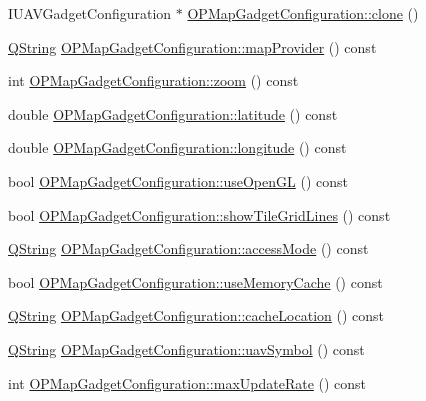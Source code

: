 \begin{DoxyCompactItemize}
\item 
\-I\-U\-A\-V\-Gadget\-Configuration $\ast$ \hyperlink{group___o_p_map_plugin_gad04d5a814a94033d32e4bbb42321c105}{\-O\-P\-Map\-Gadget\-Configuration\-::clone} ()
\item 
\hyperlink{group___u_a_v_objects_plugin_gab9d252f49c333c94a72f97ce3105a32d}{\-Q\-String} \hyperlink{group___o_p_map_plugin_ga377c1d600009ec04bfa92e3a259c7071}{\-O\-P\-Map\-Gadget\-Configuration\-::map\-Provider} () const 
\item 
int \hyperlink{group___o_p_map_plugin_ga0e5e3cbf297d14ff236edcf0ce5f4c8f}{\-O\-P\-Map\-Gadget\-Configuration\-::zoom} () const 
\item 
double \hyperlink{group___o_p_map_plugin_gaa2e49a8d2ff144343b4467f078374b0a}{\-O\-P\-Map\-Gadget\-Configuration\-::latitude} () const 
\item 
double \hyperlink{group___o_p_map_plugin_ga3faeb4ba6e69dd97e9f8451b35e47c7e}{\-O\-P\-Map\-Gadget\-Configuration\-::longitude} () const 
\item 
bool \hyperlink{group___o_p_map_plugin_ga1b6fe88d155611b041e3e1e9213f1ab5}{\-O\-P\-Map\-Gadget\-Configuration\-::use\-Open\-G\-L} () const 
\item 
bool \hyperlink{group___o_p_map_plugin_ga6bea5e6009e16f4a53c4e235dfd1594b}{\-O\-P\-Map\-Gadget\-Configuration\-::show\-Tile\-Grid\-Lines} () const 
\item 
\hyperlink{group___u_a_v_objects_plugin_gab9d252f49c333c94a72f97ce3105a32d}{\-Q\-String} \hyperlink{group___o_p_map_plugin_ga2a0ae25b0c5f6fb24f2b2f791a9fe997}{\-O\-P\-Map\-Gadget\-Configuration\-::access\-Mode} () const 
\item 
bool \hyperlink{group___o_p_map_plugin_gae363a6d1100a72e8a2089d08c192bb87}{\-O\-P\-Map\-Gadget\-Configuration\-::use\-Memory\-Cache} () const 
\item 
\hyperlink{group___u_a_v_objects_plugin_gab9d252f49c333c94a72f97ce3105a32d}{\-Q\-String} \hyperlink{group___o_p_map_plugin_gabcd898428bb8b8e721deabdec17009e0}{\-O\-P\-Map\-Gadget\-Configuration\-::cache\-Location} () const 
\item 
\hyperlink{group___u_a_v_objects_plugin_gab9d252f49c333c94a72f97ce3105a32d}{\-Q\-String} \hyperlink{group___o_p_map_plugin_ga6dc1826f569bf6b39ff56efe116dda82}{\-O\-P\-Map\-Gadget\-Configuration\-::uav\-Symbol} () const 
\item 
int \hyperlink{group___o_p_map_plugin_ga4d639157ef2beb3437a7d6e4ea3c8a61}{\-O\-P\-Map\-Gadget\-Configuration\-::max\-Update\-Rate} () const 
\item 

\end{DoxyCompactItemize}

